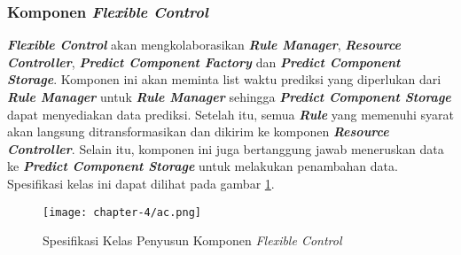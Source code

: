 \subsubsection{Komponen \textbf{\textit{Flexible Control}}}
\textbf{\textit{Flexible Control}} akan mengkolaborasikan \textbf{\textit{Rule Manager}}, \textbf{\textit{Resource Controller}}, \textbf{\textit{Predict Component Factory}} dan \textbf{\textit{Predict Component Storage}}. Komponen ini akan meminta list waktu prediksi yang diperlukan dari \textbf{\textit{Rule Manager}} untuk \textbf{\textit{Rule Manager}} sehingga \textbf{\textit{Predict Component Storage}} dapat menyediakan data prediksi. Setelah itu, semua \textbf{\textit{Rule}} yang memenuhi syarat akan langsung ditransformasikan dan dikirim ke komponen \textbf{\textit{Resource Controller}}. Selain itu, komponen ini juga bertanggung jawab meneruskan data ke \textbf{\textit{Predict Component Storage}} untuk melakukan penambahan data. Spesifikasi kelas ini dapat dilihat pada gambar \ref{fig:ac-spek}.

\begin{figure}[h]
    \centering
    \texttt{[image: chapter-4/ac.png]}
    \caption{Spesifikasi Kelas Penyusun Komponen \textit{Flexible Control}}
    \label{fig:ac-spek}
\end{figure}